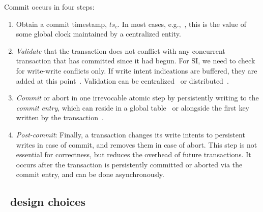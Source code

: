   Commit occurs in four steps:
  \begin{enumerate}
    \setlength{\itemsep}{0pt}
    \setlength{\parskip}{0pt}
    \setlength{\parsep}{2pt}  
  \item
  Obtain a commit timestamp, $ts_c$. 
  In most cases, e.g.,~\cite{Percolator2010,OmidICDE2014,Omid2017,tephra}, 
  this is the value of some global clock maintained by a centralized entity. 
  \item \emph{Validate} that the transaction does not conflict with any concurrent transaction that has committed since it 
had begun.  For SI, we need to check for write-write conflicts only. 
If write intent indications are buffered, they are added at this point~\cite{Percolator2010}.
Validation can be centralized~\cite{OmidICDE2014,Omid2017,tephra} or distributed~\cite{Percolator2010,cockroach}. 


\item \emph{Commit} or abort in one  irrevocable atomic step by persistently writing to the \emph{commit entry}, 
  which can reside in a global table~\cite{Omid2017,cockroach} or alongside the first  key written by 
  the transaction~\cite{Percolator2010}.  
  
 \item \emph{Post-commit}: 
  Finally, a transaction changes its write intents to
  persistent writes in case of commit, and removes them in case of abort. This
  step is not essential for correctness, but reduces the overhead of future transactions. It
  occurs after the transaction is persistently committed or aborted via the commit entry, 
  and can be done asynchronously.
 \end{enumerate}
 



\subsection{\sysll\ design choices}
\label{ssec:ll-txns}

